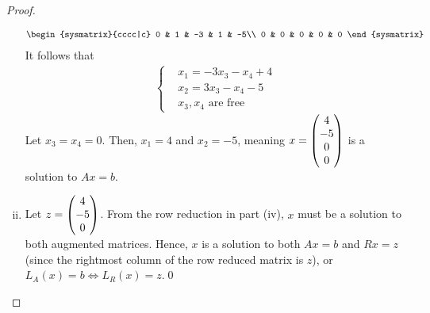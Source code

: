 \begin{proof}
\begin{enumerate}[(i)]
\begin{alignat*}{2}
\begin{sysmatrix}{cccc|c}
                0 & 1 & -3 & 1 & -5\\
                0 & 0 & 0 & 0 & 0
            \end{sysmatrix}
        \end{alignat*}
        It follows that 
        \begin{align*}
            \begin{cases}
                &x_1=-3x_3-x_4+4\\
                &x_2=3x_3-x_4-5\\
                &x_3,x_4\text{ are free}
            \end{cases}
        \end{align*}
        Let $x_3=x_4=0$. Then, $x_1=4$ and $x_2=-5$, meaning $x=\begin{pmatrix} 4\\ -5\\0 \\ 0\end{pmatrix}$ is a solution to $Ax=b$.
        \item Let $z=\begin{pmatrix} 4\\ -5\\ 0\end{pmatrix}$. From the row reduction in part (iv), $x$ must be a solution to both augmented matrices.
        Hence, $x$ is a solution to both $Ax=b$ and $Rx=z$ (since the rightmost column of the row reduced matrix is $z$), or $L_A(x)=b\iff L_R(x)=z$.\qed
    \end{enumerate}
    \renewcommand{\qedsymbol}{}
\end{proof}
 